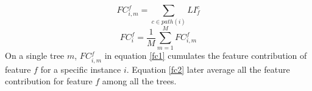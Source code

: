 \begin{equation}  \label{fc1}
FC{}_{i,m}^{f}=\sum_{c\in path(i)}LI_{f}^{c}
\end{equation}  
\begin{equation}  \label{fc2}
FC_{i}^{f}=\frac{1}{M}\sum_{m=1}^{M}FC_{i,m}^{f}
\end{equation}  
On a single tree $m$, $FC{}_{i,m}^{f}$ in equation \ref{fc1} cumulates the feature contribution of feature $f$ for a specific instance $i$. 
 Equation \ref{fc2} later average all the feature contribution for feature $f$ among all the trees.


